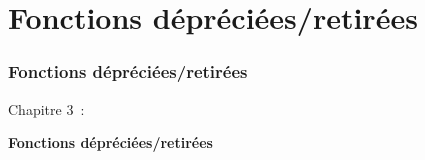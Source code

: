 %

\section{Fonctions dépréciées/retirées}
\begin{frame}[fragile]
	\frametitle{Fonctions dépréciées/retirées}

	\begin{center}\huge{Chapitre 3~:}\end{center}
	\begin{center}\huge{\color{typo3darkgrey}\textbf{Fonctions dépréciées/retirées}}\end{center}

\end{frame}


